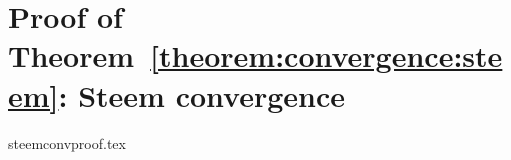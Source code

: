 \section{Proof of Theorem~\ref{theorem:convergence:steem}: Steem convergence}
  \label{appendix:proof}
  {steemconvproof.tex}
